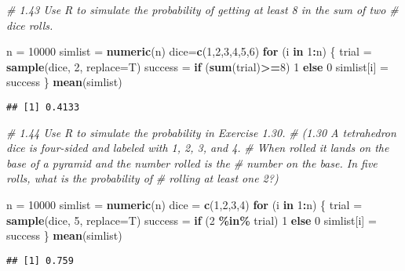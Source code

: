 \documentclass[
]{article}
\newenvironment{Shaded}{\begin{snugshade}}{\end{snugshade}}
\newcommand{\AttributeTok}[1]{\textcolor[rgb]{0.13,0.29,0.53}{#1}}
\newcommand{\CommentTok}[1]{\textcolor[rgb]{0.56,0.35,0.01}{\textit{#1}}}
\newcommand{\ControlFlowTok}[1]{\textcolor[rgb]{0.13,0.29,0.53}{\textbf{#1}}}
\newcommand{\DecValTok}[1]{\textcolor[rgb]{0.00,0.00,0.81}{#1}}
\newcommand{\FunctionTok}[1]{\textcolor[rgb]{0.13,0.29,0.53}{\textbf{#1}}}
\newcommand{\NormalTok}[1]{#1}
\newcommand{\OtherTok}[1]{\textcolor[rgb]{0.56,0.35,0.01}{#1}}
\newcommand{\SpecialCharTok}[1]{\textcolor[rgb]{0.81,0.36,0.00}{\textbf{#1}}}
\begin{document}
\begin{Shaded}
\begin{Highlighting}[]
\CommentTok{\# 1.43 Use R to simulate the probability of getting at least 8 in the sum of two}
\CommentTok{\# dice rolls.}

\NormalTok{n }\OtherTok{=} \DecValTok{10000}
\NormalTok{simlist }\OtherTok{=} \FunctionTok{numeric}\NormalTok{(n)}
\NormalTok{dice}\OtherTok{=}\FunctionTok{c}\NormalTok{(}\DecValTok{1}\NormalTok{,}\DecValTok{2}\NormalTok{,}\DecValTok{3}\NormalTok{,}\DecValTok{4}\NormalTok{,}\DecValTok{5}\NormalTok{,}\DecValTok{6}\NormalTok{)}
\ControlFlowTok{for}\NormalTok{ (i }\ControlFlowTok{in} \DecValTok{1}\SpecialCharTok{:}\NormalTok{n) \{}
\NormalTok{  trial }\OtherTok{=} \FunctionTok{sample}\NormalTok{(dice, }\DecValTok{2}\NormalTok{, }\AttributeTok{replace=}\NormalTok{T)}
\NormalTok{  success }\OtherTok{=} \ControlFlowTok{if}\NormalTok{ (}\FunctionTok{sum}\NormalTok{(trial)}\SpecialCharTok{\textgreater{}=}\DecValTok{8}\NormalTok{) }\DecValTok{1} \ControlFlowTok{else} \DecValTok{0}
\NormalTok{  simlist[i] }\OtherTok{=}\NormalTok{ success}
\NormalTok{\}}
\FunctionTok{mean}\NormalTok{(simlist)}
\end{Highlighting}
\end{Shaded}

\begin{verbatim}
## [1] 0.4133
\end{verbatim}

\begin{Shaded}
\begin{Highlighting}[]
\CommentTok{\# 1.44 Use R to simulate the probability in Exercise 1.30.}
\CommentTok{\# (1.30 A tetrahedron dice is four{-}sided and labeled with 1, 2, 3, and 4.}
\CommentTok{\# When rolled it lands on the base of a pyramid and the number rolled is the}
\CommentTok{\# number on the base. In five rolls, what is the probability of}
\CommentTok{\# rolling at least one 2?)}

\NormalTok{n }\OtherTok{=} \DecValTok{10000}
\NormalTok{simlist }\OtherTok{=} \FunctionTok{numeric}\NormalTok{(n)}
\NormalTok{dice }\OtherTok{=} \FunctionTok{c}\NormalTok{(}\DecValTok{1}\NormalTok{,}\DecValTok{2}\NormalTok{,}\DecValTok{3}\NormalTok{,}\DecValTok{4}\NormalTok{)}
\ControlFlowTok{for}\NormalTok{ (i }\ControlFlowTok{in} \DecValTok{1}\SpecialCharTok{:}\NormalTok{n) \{}
\NormalTok{  trial }\OtherTok{=} \FunctionTok{sample}\NormalTok{(dice, }\DecValTok{5}\NormalTok{, }\AttributeTok{replace=}\NormalTok{T)}
\NormalTok{  success }\OtherTok{=} \ControlFlowTok{if}\NormalTok{ (}\DecValTok{2} \SpecialCharTok{\%in\%}\NormalTok{ trial) }\DecValTok{1} \ControlFlowTok{else} \DecValTok{0}
\NormalTok{  simlist[i] }\OtherTok{=}\NormalTok{ success}
\NormalTok{\}}
\FunctionTok{mean}\NormalTok{(simlist)}
\end{Highlighting}
\end{Shaded}

\begin{verbatim}
## [1] 0.759
\end{verbatim}
\end{document}
